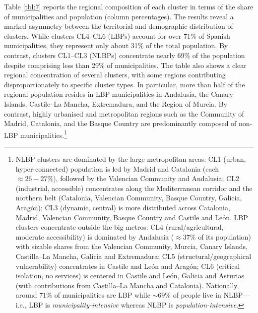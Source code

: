 \documentclass[a4paper,11pt,oneside]{article}
\begin{document}
Table \ref{tbl:7} reports the regional composition of each cluster in terms of the share of municipalities and population (column percentages). The results reveal a marked asymmetry between the territorial and demographic distribution of clusters. While clusters CL4--CL6 (LBPs) account for over 71\% of Spanish municipalities, they represent only about 31\% of the total population. By contrast, clusters CL1--CL3 (NLBPs) concentrate nearly 69\% of the population despite comprising less than 29\% of municipalities. The table also shows a clear regional concentration of several clusters, with some regions contributing disproportionately to specific cluster types. In particular, more than half of the regional population resides in LBP municipalities in Andalusia, the Canary Islands, Castile--La Mancha, Extremadura, and the Region of Murcia. By contrast, highly urbanised and metropolitan regions such as the Community of Madrid, Catalonia, and the Basque Country are predominantly composed of non-LBP municipalities.\footnote{NLBP clusters are dominated by the large metropolitan areas: CL1 (urban, hyper-connected) population is led by Madrid and Catalonia (each $\approx 26-27\%$), followed by the Valencian Community and Andalusia; CL2 (industrial, accessible) concentrates along the Mediterranean corridor and the northern belt (Catalonia, Valencian Community, Basque Country, Galicia, Aragón); CL3 (dynamic, central) is more distributed across Catalonia, Madrid, Valencian Community, Basque Country and Castile and León. LBP clusters concentrate outside the big metros: CL4 (rural/agricultural, moderate accessibility) is dominated by Andalusia ($\approx 37\%$ of its population) with sizable shares from the Valencian Community, Murcia, Canary Islands, Castilla--La Mancha, Galicia and Extremadura; CL5 (structural/geographical vulnerability) concentrates in Castile and León and Aragón; CL6 (critical isolation, no services) is centered in Castile and León, Galicia and Asturias (with contributions from Castilla--La Mancha and Catalonia). Nationally, around \(71\%\) of municipalities are LBP while \(\sim 69\%\) of people live in NLBP—i.e., LBP is \textsl{municipality-intensive} whereas NLBP is \textsl  {population-intensive}.}
\end{document}
